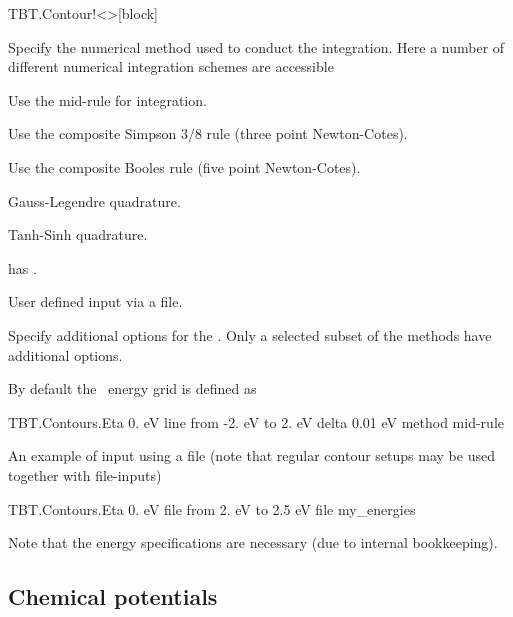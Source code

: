 \begin{fdfentry}{TBT.Contour!<>}[block]
\begin{fdfoptions}
    \option[method]%

    Specify the numerical method used to conduct the integration. Here
    a number of different numerical integration schemes are accessible

    \begin{fdfoptions}
      Use the mid-rule for integration.

      Use the composite Simpson $3/8$ rule (three point Newton-Cotes).

      Use the composite Booles rule (five point Newton-Cotes).
 
      \option[G-legendre]%
      Gauss-Legendre quadrature.

      Tanh-Sinh quadrature.

      \note has .

      \option[user]%
      User defined input via a file.

    \end{fdfoptions}

    \option[opt]%

    Specify additional options for the . Only a selected
    subset of the methods have additional options.

  \end{fdfoptions}

\end{fdfentry}

By default the \tbtrans\ energy grid is defined as
\begin{fdfexample}
  TBT.Contours.Eta 0. eV
    line
     from -2. eV to 2. eV
      delta 0.01 eV
        method mid-rule
\end{fdfexample}

An example of input using a file (note that regular contour setups may
be used together with file-inputs)
\begin{fdfexample}
  TBT.Contours.Eta 0. eV
    file
     from 2. eV to 2.5 eV
      file my_energies
\end{fdfexample}
Note that the energy specifications are necessary (due to internal
bookkeeping).

\subsection{Chemical potentials}


